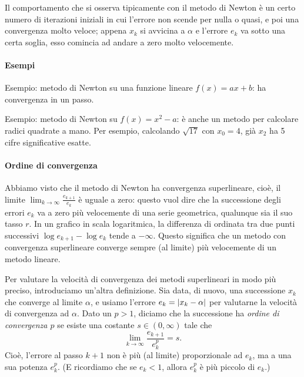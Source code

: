 \documentclass[a4paper]{report}
\DeclarePairedDelimiter{\abs}{\lvert}{\rvert}
\theoremstyle{definition}
\theoremstyle{remark}
\begin{document}
Il comportamento che si osserva tipicamente con il metodo di Newton è un certo numero di iterazioni iniziali in cui l'errore non scende per nulla o quasi, e poi una convergenza molto veloce; appena $x_k$ si avvicina a $\alpha$ e l'errore $e_k$ va sotto una certa soglia, esso comincia ad andare a zero molto velocemente.

\paragraph{Esempi}

Esempio: metodo di Newton su una funzione lineare $f(x) = a x + b$: ha convergenza in un passo.

Esempio: metodo di Newton su $f(x) = x^2-a$: è anche un metodo per calcolare radici quadrate a mano. Per esempio, calcolando $\sqrt{17}$ con $x_0 = 4$, già $x_2$ ha 5 cifre significative esatte.

\paragraph{Ordine di convergenza}

Abbiamo visto che il metodo di Newton ha convergenza superlineare, cioè, il limite $\lim_{k \to \infty }\frac{e_{k+1}}{e_k}$ è uguale a zero: questo vuol dire che la successione degli errori $e_k$ va a zero più velocemente di una serie geometrica, qualunque sia il suo tasso $r$. In un grafico in scala logaritmica, la differenza di ordinata tra due punti successivi $\log e_{k+1} - \log e_k$ tende a $-\infty$. Questo significa che un metodo con convergenza superlineare converge sempre (al limite) più velocemente di un metodo lineare.

Per valutare la velocità di convergenza dei metodi superlineari in modo più preciso, introduciamo un'altra definizione. Sia data, di nuovo, una successione $x_k$ che converge al limite $\alpha$, e usiamo l'errore $e_k = \abs{x_k - \alpha}$ per valutarne la velocità di convergenza ad $\alpha$. Dato un $p > 1$, diciamo che la successione ha \emph{ordine di convergenza $p$} se esiste una costante $s\in (0,\infty)$ tale che
\begin{equation} \label{convergenza di ordine p}
    \lim_{k \to \infty }\frac{e_{k+1}}{e_k^p} = s.    
\end{equation}
Cioè, l'errore al passo $k+1$ non è più (al limite) proporzionale ad $e_k$, ma a una sua potenza $e_k^p$. (E ricordiamo che se $e_k<1$, allora $e_k^p$ è più piccolo di $e_k$.)
\end{document}
